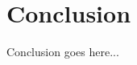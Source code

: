 \documentclass[10pt,letterpaper,onecolumn,draftclsnofoot,journal]{IEEEtran}
\begin{document}
\section{Conclusion}
Conclusion goes here...


%
%
\end{document}
